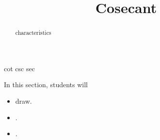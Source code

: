 \documentclass{ximera}
\title{Cosecant}
\begin{document}
\begin{abstract}
characteristics
\end{abstract}
\maketitle



cot csc sec

\begin{sectionOutcomes}
In this section, students will 

\begin{itemize}
\item draw.
\item .
\item .
\end{itemize}
\end{sectionOutcomes}
\end{document}
